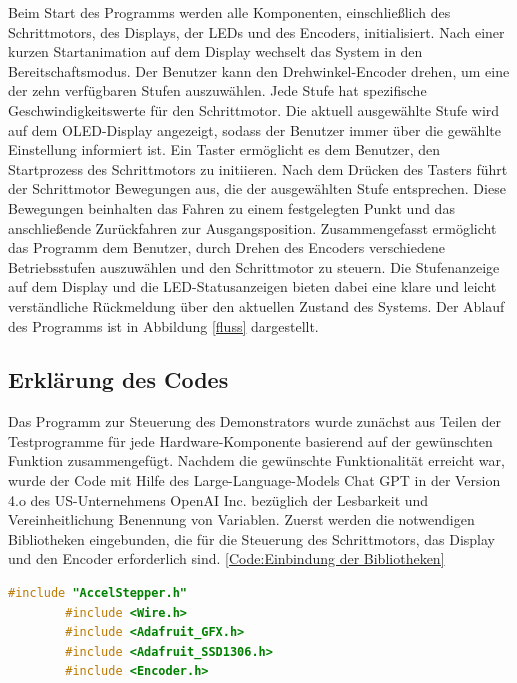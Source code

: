 {{{Beim Start des Programms werden alle Komponenten, einschließlich des Schrittmotors, des Displays, der LEDs und des Encoders, initialisiert. Nach einer kurzen Startanimation auf dem Display wechselt das System in den Bereitschaftsmodus. Der Benutzer kann den Drehwinkel-Encoder drehen, um eine der zehn verfügbaren Stufen auszuwählen. Jede Stufe hat spezifische Geschwindigkeitswerte für den Schrittmotor. Die aktuell ausgewählte Stufe wird auf dem OLED-Display angezeigt, sodass der Benutzer immer über die gewählte Einstellung informiert ist. Ein Taster ermöglicht es dem Benutzer, den Startprozess des Schrittmotors zu initiieren. Nach dem Drücken des Tasters führt der Schrittmotor Bewegungen aus, die der ausgewählten Stufe entsprechen. Diese Bewegungen beinhalten das Fahren zu einem festgelegten Punkt und das anschließende Zurückfahren zur Ausgangsposition. Zusammengefasst ermöglicht das Programm dem Benutzer, durch Drehen des Encoders verschiedene Betriebsstufen auszuwählen und den Schrittmotor zu steuern. Die Stufenanzeige auf dem Display und die LED-Statusanzeigen bieten dabei eine klare und leicht verständliche Rückmeldung über den aktuellen Zustand des Systems. Der Ablauf des Programms ist in Abbildung \ref{fluss} dargestellt.

\subsection{Erklärung des Codes}

Das Programm zur Steuerung des Demonstrators wurde zunächst aus Teilen der Testprogramme für jede Hardware-Komponente basierend auf der gewünschten Funktion zusammengefügt. Nachdem die gewünschte Funktionalität erreicht war, wurde der Code mit Hilfe des Large-Language-Models Chat GPT in der Version 4.o des US-Unternehmens OpenAI Inc. bezüglich der Lesbarkeit und Vereinheitlichung Benennung von Variablen.
Zuerst werden die notwendigen Bibliotheken eingebunden, die für die Steuerung des Schrittmotors, das Display und den Encoder erforderlich sind. \ref{Code:Einbindung der Bibliotheken}

\begin{code}
	\begin{lstlisting}[language=c++]
		#include "AccelStepper.h"
		#include <Wire.h>
		#include <Adafruit_GFX.h>
		#include <Adafruit_SSD1306.h>
		#include <Encoder.h>
	\end{lstlisting}      
	
	\caption[Einbindung der Bibliotheken]{Einbindung der Bibliotheken}\label{Code:Einbindung der Bibliotheken}    
\end{code} 

}}}
